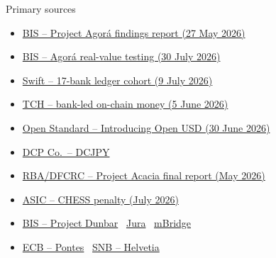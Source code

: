 \documentclass[aspectratio=169,12pt]{beamer}
\newcommand{\verytightitems}{\setlength{\itemsep}{0.22em}\setlength{\parskip}{0pt}}
\begin{document}
\begin{frame}{Primary sources}
  \fontsize{8.1}{9.7}\selectfont
  \begin{itemize}\verytightitems
    \item \href{https://www.bis.org/publ/othp110.htm}{BIS -- Project Agor\'a findings report (27 May 2026)}
    \item \href{https://www.bis.org/about/bisih/topics/fmis/agora/rvt.htm}{BIS -- Agor\'a real-value testing (30 July 2026)}
    \item \href{https://www.swift.com/news-events/press-releases/swifts-blockchain-ledger-ready-use-17-banks-set-pioneer-tokenised-cross-border-payments-trusted-global-infrastructure}{Swift -- 17-bank ledger cohort (9 July 2026)}
    \item \href{https://www.theclearinghouse.org/payment-systems/Articles/2026/06/Major-Financial-Institutions-Unveil-Bank-Led-On-Chain-Money-Initiative}{TCH -- bank-led on-chain money (5 June 2026)}
    \item \href{https://joinopenstandard.com/blog/introducing-open-usd}{Open Standard -- Introducing Open USD (30 June 2026)}
    \item \href{https://www.dcjpy.com/en/}{DCP Co.\ -- DCJPY}
    \item \href{https://www.rba.gov.au/payments-and-infrastructure/central-bank-digital-currency/pdf/project-acacia-final-report.pdf}{RBA/DFCRC -- Project Acacia final report (May 2026)}
    \item \href{https://www.asic.gov.au/about-asic/news-centre/find-a-media-release/2026-releases/26-143mr-asx-ordered-to-pay-20-5-million-penalty-for-misleading-conduct-relating-to-chess-replacement-project/}{ASIC -- CHESS penalty (July 2026)}
    \item \href{https://www.bis.org/publ/othp47.htm}{BIS -- Project Dunbar} \textperiodcentered\ \href{https://www.bis.org/publ/othp44.htm}{Jura} \textperiodcentered\ \href{https://www.bis.org/about/bisih/topics/cbdc/mcbdc_bridge.htm}{mBridge}
    \item \href{https://www.ecb.europa.eu/paym/target/pontes/html/index.en.html}{ECB -- Pontes} \textperiodcentered\ \href{https://www.snb.ch/en/the-snb/mandates-goals/payment-transactions/projekt_helvetia}{SNB -- Helvetia}
  \end{itemize}
\end{frame}
\end{document}
